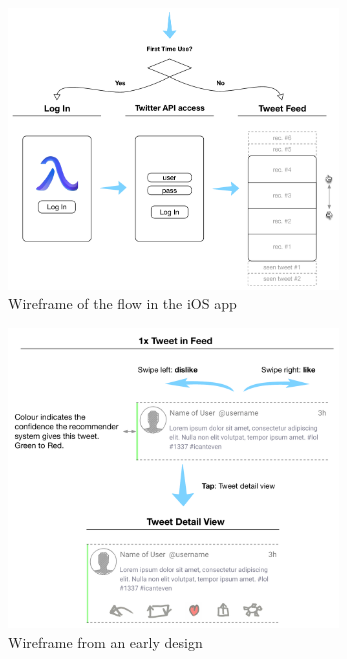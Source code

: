\documentclass{article}
\begin{document}
\begin{figure}[H]
    \centering
    \includegraphics[width=0.78\textwidth]{ios_wireframe_1}  
    \caption{Wireframe of the flow in the iOS app}
\end{figure}

\begin{figure}[H]
    \centering
    \includegraphics[width=0.78\textwidth]{ios_wireframe_2}  
    \caption{Wireframe from an early design}
\end{figure}


\newpage
\end{document}
